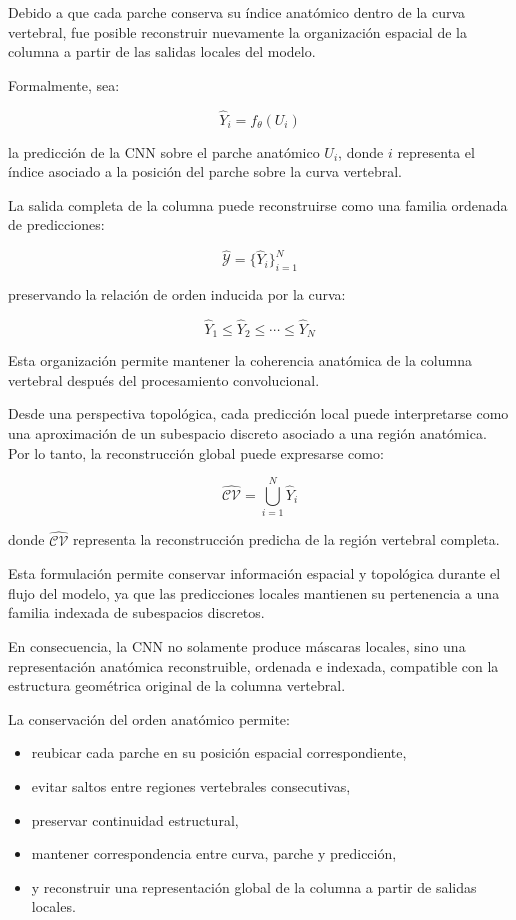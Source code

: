 \documentclass[conference]{IEEEtran}
\begin{document}
Debido a que cada parche conserva su índice anatómico dentro de la curva vertebral, fue posible reconstruir nuevamente la organización espacial de la columna a partir de las salidas locales del modelo.

Formalmente, sea:

\[
\hat{Y}_i = f_\theta(U_i)
\]

la predicción de la CNN sobre el parche anatómico \(U_i\), donde \(i\) representa el índice asociado a la posición del parche sobre la curva vertebral.

La salida completa de la columna puede reconstruirse como una familia ordenada de predicciones:

\[
\hat{\mathcal{Y}} =
\{\hat{Y}_i\}_{i=1}^{N}
\]

preservando la relación de orden inducida por la curva:

\[
\hat{Y}_1 \leq \hat{Y}_2 \leq \cdots \leq \hat{Y}_N
\]

Esta organización permite mantener la coherencia anatómica de la columna vertebral después del procesamiento convolucional.

Desde una perspectiva topológica, cada predicción local puede interpretarse como una aproximación de un subespacio discreto asociado a una región anatómica. Por lo tanto, la reconstrucción global puede expresarse como:

\[
\hat{\mathcal{CV}}
=
\bigcup_{i=1}^{N} \hat{Y}_i
\]

donde \(\hat{\mathcal{CV}}\) representa la reconstrucción predicha de la región vertebral completa.

Esta formulación permite conservar información espacial y topológica durante el flujo del modelo, ya que las predicciones locales mantienen su pertenencia a una familia indexada de subespacios discretos.

En consecuencia, la CNN no solamente produce máscaras locales, sino una representación anatómica reconstruible, ordenada e indexada, compatible con la estructura geométrica original de la columna vertebral.

La conservación del orden anatómico permite:

\begin{itemize}
    \item reubicar cada parche en su posición espacial correspondiente,
    \item evitar saltos entre regiones vertebrales consecutivas,
    \item preservar continuidad estructural,
    \item mantener correspondencia entre curva, parche y predicción,
    \item y reconstruir una representación global de la columna a partir de salidas locales.
\end{itemize}
\end{document}
